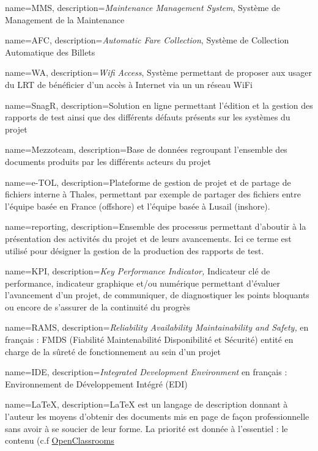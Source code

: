 {
	name=MMS,
	description={\textit{Maintenance Management System}, Système de Management de la Maintenance}
}

{
	name=AFC,
	description={\textit{Automatic Fare Collection}, Système de Collection Automatique des Billets}
}

{
	name=WA,
	description={\textit{Wifi Access}, Système permettant de proposer aux usager du LRT de bénéficier d'un accès à Internet via un un réseau WiFi}
}

{
	name=SnagR,
	description={Solution en ligne permettant l'édition et la gestion des rapports de test ainsi que des différents défauts présents sur les systèmes du projet }
}


{
	name=Mezzoteam,
	description={Base de données regroupant l'ensemble des documents produits par les différents acteurs du projet}
}

{
	name=e-TOL,
	description={Plateforme de gestion de projet et de partage de fichiers interne à Thales, permettant par exemple de partager des fichiers entre l'équipe basée en France (offshore) et l'équipe basée à Lusail (inshore).}
}

{
	name=reporting,
	description={Ensemble des processus permettant d'aboutir à la présentation des activités du projet et de leurs avancements. Ici ce terme est utilisé pour désigner la gestion de la production des rapports de test.}
}

{
	name=KPI,
	description={\textit{Key Performance Indicator,} Indicateur clé de performance, indicateur graphique et/ou numérique permettant d'évaluer l'avancement d'un projet, de communiquer, de diagnostiquer les points bloquants ou encore de s'assurer de la continuité du progrès}
}

{
	name=RAMS,
	description={\textit{Reliability Availability Maintainability and Safety,} en français : FMDS (Fiabilité Maintenabilité Disponibilité et Sécurité) entité en charge de la sûreté de fonctionnement au sein d'un projet}
}

{
	name=IDE,
	description={\textit{Integrated Development Environment} en français :  Environnement de Développement Intégré (EDI) }
}

{
	name=LaTeX,
	description={LaTeX est un langage de description donnant à l'auteur les moyens d'obtenir des documents mis en page de façon professionnelle sans avoir à se soucier de leur forme. La priorité est donnée à l'essentiel : le contenu (c.f \href{https://openclassrooms.com/fr/courses/1617396-redigez-des-documents-de-qualite-avec-latex/1617565-quest-ce-que-latex}{OpenClassrooms}}
}

